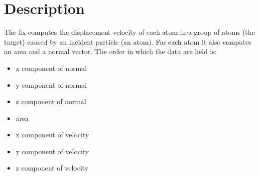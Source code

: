 \documentclass[11pt,a4paper]{article}
\begin{document}
\section*{Description}
The fix computes the displacement velocity of each atom in a group of atoms (the target) caused by an incident particle (an atom). For each atom it also computes an area and a normal vector. The order in which the data are held is:
\begin{itemize}
\item[] x component of normal
\item[] y component of normal
\item[] z component of normal
\item[] area
\item[] x component of velocity
\item[] y component of velocity
\item[] z component of velocity
\end{itemize}
\end{document}
